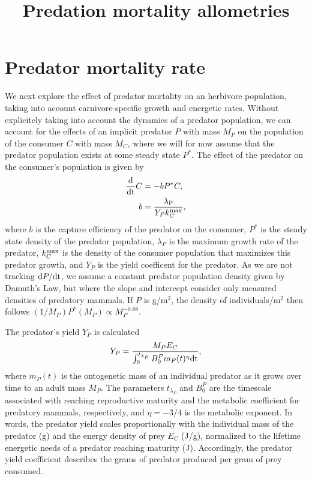 \documentclass[onecolumn,preprintnumbers,amsmath,amssymb,superscriptaddress]{revtex4}
\begin{document}




\title{Predation mortality allometries}

\maketitle

\section*{Predator mortality rate}

We next explore the effect of predator mortality on an herbivore population, taking into account carnivore-specific growth and energetic rates.
Without explicitely taking into account the dynamics of a predator population, we can account for the effects of an implicit predator $P$ with mass $M_P$ on the population of the consumer $C$ with mass $M_C$, where we will for now assume that the predator population exists at some steady state $P^*$.
The effect of the predator on the consumer's population is given by
\begin{align}
\frac{\rm d}{\rm dt}C &= -bP^*C, \nonumber \\
	b &= \frac{\lambda_{\rm P}}{Y_P k_C^{\rm max}},
\end{align}
where $b$ is the capture efficiency of the predator on the consumer, $P^*$ is the steady state density of the predator population, $\lambda_P$ is the maximum growth rate of the predator, $k_C^{\rm max}$ is the density of the consumer population that maximizes this predator growth, and $Y_P$ is the yield coefficent for the predator.
As we are not tracking ${\rm d}P/{\rm dt}$, we assume a constant predator population density given by Damuth's Law, but where the slope and intercept consider only measured densities of predatory mammals.
If $P$ is g/m${}^2$, the density of individuals/m${}^2$ then follows $(1/M_P)P^*(M_P) \propto M_P^{-0.88}$. 


The predator's yield $Y_P$ is calculated
\begin{equation}
Y_P = \frac{M_P E_C}{\int_0^{t_{\lambda_P}}B_0^Pm_P(t)^\eta {\rm dt}},
\end{equation}
where $m_P(t)$ is the ontogenetic mass of an individual predator as it grows over time to an adult mass $M_P$.
The parameters $t_{\lambda_P}$ and $B_0^P$ are the timescale associated with reaching reproductive maturity and the metabolic coefficient for predatory mammals, respectively, and $\eta=-3/4$ is the metabolic exponent.
In words, the predator yield scales proportionally with the individual mass of the predator (g) and the energy density of prey $E_C$ (J/g), normalized to the lifetime energetic needs of a predator reaching maturity (J).
Accordingly, the predator yield coefficient describes the grams of predator produced per gram of prey consumed.
\end{document}
